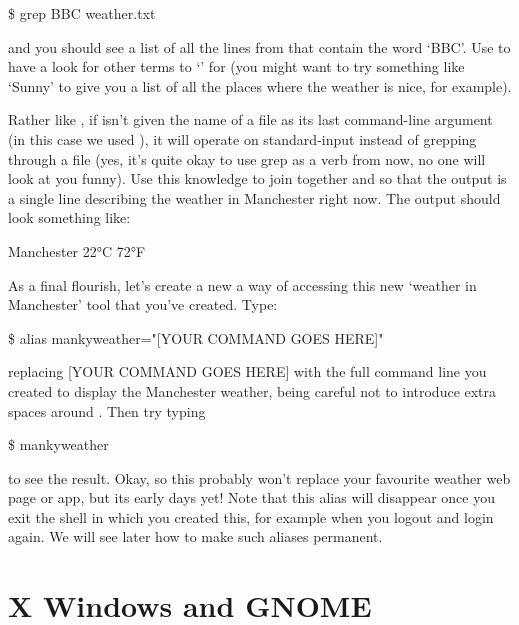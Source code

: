 \begin{ttoutenv}
\$ grep BBC weather.txt
\end{ttoutenv}

and you should see a list of all the lines from  that contain the word `BBC'. Use  to have a look for other terms to `' for (you might want to try something like `Sunny' to give you a list of all the places where the weather is nice, for example). 

Rather like , if  isn't given the name of a file as its last command-line argument (in this case we used ), it will operate on standard-input instead of grepping through a file (yes, it's quite okay to use grep as a verb from now, no one will look at you funny). Use this knowledge to join together  and  so that the output is a single line describing the weather in Manchester right now. The output should look something like:

\begin{ttoutenv}
   [33]Manchester 22°C 72°F
\end{ttoutenv}

As a final flourish, let's create a new a way of accessing this new `weather in Manchester' tool that you've created. Type:

\begin{ttoutenv}
\$ alias mankyweather="[YOUR COMMAND GOES HERE]"
\end{ttoutenv}

replacing [YOUR COMMAND GOES HERE] with the full command line you created to display the Manchester weather, being careful not to introduce extra spaces around \ttout{=}. Then try typing

\begin{ttoutenv}
\$ mankyweather
\end{ttoutenv}


to see the result. Okay, so this probably won't replace your favourite weather web page or app, but its early days yet! 
Note that this alias will disappear once you exit the shell in which you created this, for example when you logout and login again. We will see later how to make such aliases permanent.


\section{X Windows and GNOME} 

